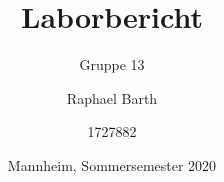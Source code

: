 
 \subject{Biomedizinische Elektronik}   %

\title{Laborbericht}

\author{Gruppe 13 \and Raphael Barth \and 
1727882}

\date{Mannheim, Sommersemester 2020}





